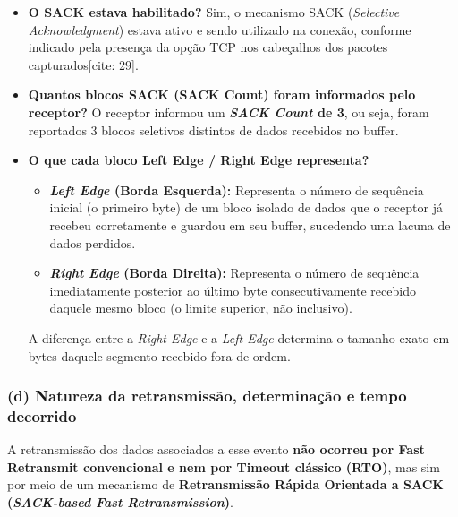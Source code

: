 \documentclass[
    12pt,
    a4paper,
    oneside
]{article}
\begin{document}
\begin{itemize}
    \item \textbf{O SACK estava habilitado?} Sim, o mecanismo SACK (\textit{Selective Acknowledgment}) estava ativo e sendo utilizado na conexão, conforme indicado pela presença da opção TCP nos cabeçalhos dos pacotes capturados[cite: 29].
    \item \textbf{Quantos blocos SACK (SACK Count) foram informados pelo receptor?} O receptor informou um \textbf{\textit{SACK Count} de 3}, ou seja, foram reportados 3 blocos seletivos distintos de dados recebidos no buffer.
    \item \textbf{O que cada bloco Left Edge / Right Edge representa?} 
    \begin{itemize}
        \item \textbf{\textit{Left Edge} (Borda Esquerda):} Representa o número de sequência inicial (o primeiro byte) de um bloco isolado de dados que o receptor já recebeu corretamente e guardou em seu buffer, sucedendo uma lacuna de dados perdidos.
        \item \textbf{\textit{Right Edge} (Borda Direita):} Representa o número de sequência imediatamente posterior ao último byte consecutivamente recebido daquele mesmo bloco (o limite superior, não inclusivo).
    \end{itemize}
    A diferença entre a \textit{Right Edge} e a \textit{Left Edge} determina o tamanho exato em bytes daquele segmento recebido fora de ordem.
\end{itemize}

\subsubsection*{(d) Natureza da retransmissão, determinação e tempo decorrido}

A retransmissão dos dados associados a esse evento \textbf{não ocorreu por Fast Retransmit convencional e nem por Timeout clássico (RTO)}, mas sim por meio de um mecanismo de \textbf{Retransmissão Rápida Orientada a SACK (\textit{SACK-based Fast Retransmission})}. 
\end{document}
